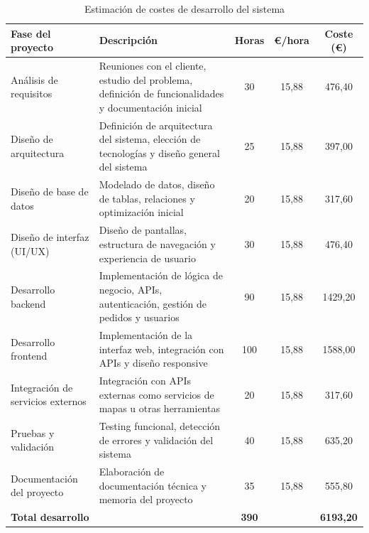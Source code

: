 \begin{table}[H]
\centering
\small
\caption{Estimación de costes de desarrollo del sistema}
\label{tabla_coste_desarrollo}
\begin{tabularx}{\textwidth}{|L{2.8cm}|Y|c|c|c|}
\hline
\textbf{Fase del proyecto} & \textbf{Descripción} & \textbf{Horas} & \textbf{\euro/hora} & \textbf{Coste (\euro)} \\ \hline

Análisis de requisitos &
Reuniones con el cliente, estudio del problema, definición de funcionalidades y documentación inicial &
30 & 15,88 & 476,40 \\ \hline

Diseño de arquitectura &
Definición de arquitectura del sistema, elección de tecnologías y diseño general del sistema &
25 & 15,88 & 397,00 \\ \hline

Diseño de base de datos &
Modelado de datos, diseño de tablas, relaciones y optimización inicial &
20 & 15,88 & 317,60 \\ \hline

Diseño de interfaz (UI/UX) &
Diseño de pantallas, estructura de navegación y experiencia de usuario &
30 & 15,88 & 476,40 \\ \hline

Desarrollo backend &
Implementación de lógica de negocio, APIs, autenticación, gestión de pedidos y usuarios &
90 & 15,88 & 1429,20 \\ \hline

Desarrollo frontend &
Implementación de la interfaz web, integración con APIs y diseño responsive &
100 & 15,88 & 1588,00 \\ \hline

Integración de servicios externos &
Integración con APIs externas como servicios de mapas u otras herramientas &
20 & 15,88 & 317,60 \\ \hline

Pruebas y validación &
Testing funcional, detección de errores y validación del sistema &
40 & 15,88 & 635,20 \\ \hline

Documentación del proyecto &
Elaboración de documentación técnica y memoria del proyecto &
35 & 15,88 & 555,80 \\ \hline

\textbf{Total desarrollo} & & \textbf{390} & & \textbf{6193,20} \\ \hline

\end{tabularx}
\end{table}


